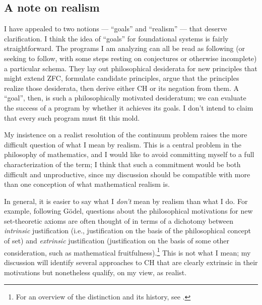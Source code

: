 \documentclass[letterpaper,12pt]{article}
\begin{document}
\subsection{A note on realism}
I have appealed to two notions --- ``goals'' and ``realism'' --- that deserve clarification. I think the idea of ``goals'' for foundational systems is fairly straightforward. The programs I am analyzing can all be read as following (or seeking to follow, with some steps resting on conjectures or otherwise incomplete) a particular schema. They lay out philosophical desiderata for new principles that might extend ZFC, formulate candidate principles, argue that the principles realize those desiderata, then derive either CH or its negation from them. A ``goal'', then, is such a philosophically motivated desideratum; we can evaluate the success of a program by whether it achieves its goals. I don't intend to claim that every such program must fit this mold.

My insistence on a realist resolution of the continuum problem raises the more difficult question of what I mean by realism. This is a central problem in the philosophy of mathematics, and I would like to avoid committing myself to a full characterization of the term; I think that such a commitment would be both difficult and unproductive, since my discussion should be compatible with more than one conception of what mathematical realism is.

In general, it is easier to say what I \emph{don't} mean by realism than what I do. For example, following G\"odel, questions about the philosophical motivations for new set-theoretic axioms are often thought of in terms of a dichotomy between \emph{intrinsic} justification (i.e., justification on the basis of the philosophical concept of set) and \emph{extrinsic} justification (justification on the basis of some other consideration, such as mathematical fruitfulness).\footnote{For an overview of the distinction and its history, see \cite{koellner2009reflection}.} This is not what I mean; my discussion will identify several approaches to CH that are clearly extrinsic in their motivations but nonetheless qualify, on my view, as realist.

\end{document}
